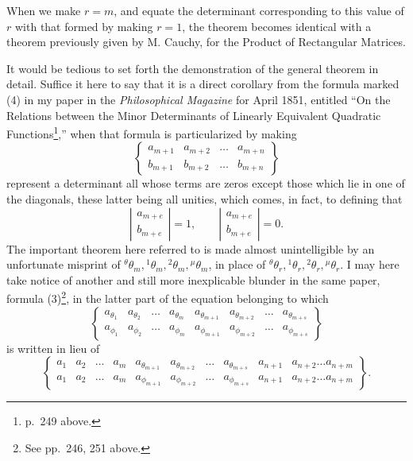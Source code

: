 \documentclass[11pt]{article}
\newcommand{\sourcepage}[1]{\marginpar{\scriptsize p.~#1}}
\begin{document}
{{When we make $r=m$, and equate the determinant corresponding to this value of $r$ with that formed by making $r=1$, the theorem becomes identical with a theorem previously given by M. Cauchy, for the Product of Rectangular Matrices.

\sourcepage{401}
It would be tedious to set forth the demonstration of the general theorem in detail. Suffice it here to say that it is a direct corollary from the formula marked (4) in my paper in the \emph{Philosophical Magazine} for April 1851, entitled ``On the Relations between the Minor Determinants of Linearly Equivalent Quadratic Functions\footnote{p.~249 above.},'' when that formula is particularized by making
\[
\left\{\begin{array}{cccc}
a_{m+1}&a_{m+2}&\ldots&a_{m+n}\\
b_{m+1}&b_{m+2}&\ldots&b_{m+n}
\end{array}\right\}
\]
represent a determinant all whose terms are zeros except those which lie in one of the diagonals, these latter being all unities, which comes, in fact, to defining that
\[
\left|\begin{array}{c}a_{m+e}\\ b_{m+e}\end{array}\right|=1,\qquad
\left|\begin{array}{c}a_{m+e}\\ b_{m+e}\end{array}\right|=0.
\]
The important theorem here referred to is made almost unintelligible by an unfortunate misprint of ${}^{\theta}\theta_m,{}^{1}\theta_m,{}^{2}\theta_m,{}^{\mu}\theta_m$, in place of ${}^{\theta}\theta_r,{}^{1}\theta_r,{}^{2}\theta_r,{}^{\mu}\theta_r$. I may here take notice of another and still more inexplicable blunder in the same paper, formula (3)\footnote{See pp.~246, 251 above.}, in the latter part of the equation belonging to which
\[
\left\{\begin{array}{cccccccc}
a_{\theta_1}&a_{\theta_2}&\ldots&a_{\theta_m}&a_{\theta_{m+1}}&a_{\theta_{m+2}}&\ldots&a_{\theta_{m+s}}\\
a_{\phi_1}&a_{\phi_2}&\ldots&a_{\phi_m}&a_{\phi_{m+1}}&a_{\phi_{m+2}}&\ldots&a_{\phi_{m+s}}
\end{array}\right\}
\]
is written in lieu of
\[
\left\{\begin{array}{cccccccccc}
a_1&a_2&\ldots&a_m&a_{\theta_{m+1}}&a_{\theta_{m+2}}&\ldots&a_{\theta_{m+s}}&a_{n+1}&a_{n+2}\ldots a_{n+m}\\
a_1&a_2&\ldots&a_m&a_{\phi_{m+1}}&a_{\phi_{m+2}}&\ldots&a_{\phi_{m+s}}&a_{n+1}&a_{n+2}\ldots a_{n+m}
\end{array}\right\}.
\]


}}
\end{document}
